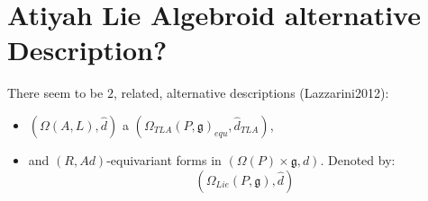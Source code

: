 \section{Atiyah Lie Algebroid alternative Description?}

There seem to be $2$, related, alternative descriptions (Lazzarini2012):
    
    \begin{itemize}
        
    \item $(\Omega(A, L), \hat d)$ a $(\Omega_{TLA}(P, \mathfrak g)_{equ}, \hat d_{TLA})$,
    
    \item and $(R, Ad)$-equivariant forms in $(\Omega(P) \times \mathfrak g, d)$. Denoted by: \[ (\Omega_{Lie}(P, \mathfrak g), \hat d) \]
        
    \end{itemize}

